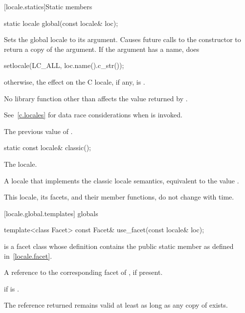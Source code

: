 [locale.statics]{Static members}

%
\begin{itemdecl}
static locale global(const locale& loc);
\end{itemdecl}

\begin{itemdescr}
\pnum
\effects
Sets the global locale to its argument.
Causes future calls to the constructor
to return a copy of the argument.
If the argument has a name, does
\begin{codeblock}
setlocale(LC_ALL, loc.name().c_str());
\end{codeblock}
otherwise, the effect on the C locale, if any, is .

\pnum
\remarks
No library function other than
affects the value returned by
.
\begin{note}
See~\ref{c.locales} for data race considerations when
 is invoked.
\end{note}

\pnum
\returns
The previous value of
.
\end{itemdescr}

%
\begin{itemdecl}
static const locale& classic();
\end{itemdecl}

\begin{itemdescr}
\pnum
The  locale.

\pnum
\returns
A locale that implements the classic  locale semantics, equivalent
to the value .

\pnum
\remarks
This locale, its facets, and their member functions, do not change
with time.
\end{itemdescr}

[locale.global.templates]{ globals}

%
\begin{itemdecl}
template<class Facet> const Facet& use_facet(const locale& loc);
\end{itemdecl}

\begin{itemdescr}
\pnum
\mandates
{}
is a facet class whose definition contains the public static member
as defined in~\ref{locale.facet}.

\pnum
\returns
A reference to the corresponding facet of , if present.

\pnum
\throws
{}
if
is
.

\pnum
\remarks
The reference returned remains valid at least as long as any copy of
 exists.
\end{itemdescr}

